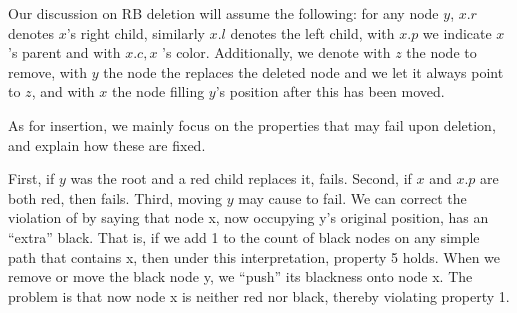 \documentclass{subfiles}
\begin{document}
    Our discussion on RB deletion will assume the following:
        for any node \(y\), \(x.r\) denotes \(x\)'s right child,
        similarly \(x.l\) denotes the left child,
        with \(x.p\) we indicate \(x\)'s parent and with \(x.c, x\) 's color.
        Additionally, we denote with \(z\) the node to remove, 
            with \(y\) the node the replaces the deleted node and we let it always point to \(z\),
            and with \(x\) the node filling \(y\)'s position after this has been moved.

    As for insertion, we mainly focus on the properties that may fail upon deletion,
        and explain how these are fixed. 

    First, if \(y\) was the root and a red child replaces it,  fails.
        Second, if \(x\) and \(x.p\) are both red, then  fails.
        Third, moving \(y\) may cause  to fail.
        We can correct the violation of  by saying that node x,
        now occupying y’s original position, has an ``extra'' black.
        That is, if we add 1 to the count of black nodes on any simple path
        that contains x, then under this interpretation, property 5 holds. When we remove
        or move the black node y, we “push” its blackness onto node x. 
        The problem is that now node x is neither red nor black, thereby violating property 1.

    
    
\end{document}
